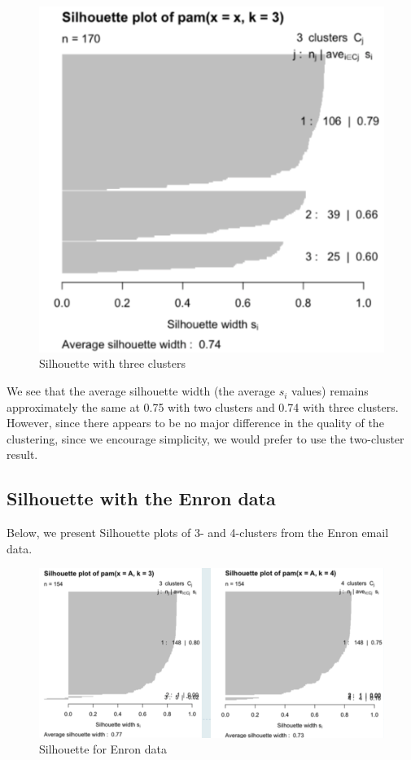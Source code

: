 \begin{figure}[H]
\begin{center}
\includegraphics[scale=0.4]{silhouette3.png}
\end{center}
\caption{Silhouette with three clusters}
\label{fig:sil3}
\end{figure}



We see that the average silhouette width (the average $s_i$ values) remains approximately the same at 0.75 with two clusters and 0.74 with three clusters. However, since there appears to be no major difference in the quality of the clustering, since we encourage simplicity, we would prefer to use the two-cluster result.


\subsection*{Silhouette with the Enron data}

Below, we present Silhouette plots of 3- and 4-clusters from the Enron email data.


\begin{figure}[H]
\begin{center}
\includegraphics[scale=0.4]{enron_silhouette.png}
\end{center}
\caption{Silhouette for Enron data}
\label{fig:sil_enron}
\end{figure}

